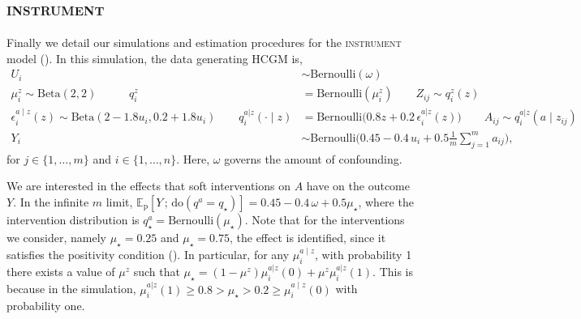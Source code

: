 \documentclass[12pt]{article}
\newcommand{\rmdo}{\mathrm{do}}
\newcommand{\s}{\, ; \,}
\newcommand{\pr}{\mathrm{p}}
\begin{document}
\subsection{\textsc{instrument}} \label{apx:instrument_sim}

Finally we detail our simulations and estimation procedures for the \textsc{instrument} model ().
In this simulation, the data generating HCGM is,
\begin{equation*}
\begin{split}
        U_i &\sim \mathrm{Bernoulli}(\omega)\\
        \mu_i^{z} \sim \mathrm{Beta}(2, 2)  \, \, \, \, \, \quad \quad q^{z}_i &= \mathrm{Bernoulli}(\mu_i^{z})
        \quad \quad Z_{ij} \sim q^{z}_i(z)\\
        \epsilon_i^{a \mid z}(z) \sim \mathrm{Beta}(2 - 1.8 u_i, 0.2 +  1.8 u_i) \quad \quad q^{a | z}_i(\cdot \mid z) &= \mathrm{Bernoulli}\Big(0.8 z + 0.2 \, \epsilon_i^{a |z }(z)\Big) \quad \quad 
        A_{ij} \sim q^{a |z }_i(a \mid z_{ij}) \\ Y_i &\sim \mathrm{Bernoulli}\Big(0.45 - 0.4\, u_i + 0.5\frac{1}{m}\sum_{j=1}^m a_{ij} \Big),
\end{split}
\end{equation*}
for $j \in \{1, \ldots, m\}$ and $i \in\{1, \ldots,n\}$.
Here, $\omega$ governs the amount of confounding.


We are interested in the effects that soft interventions on $A$ have on the outcome $Y$.
In the infinite $m$ limit,
$\mathbb{E}_\pr[Y \s \rmdo(q^{a} = q_\star)] = 0.45 - 0.4\, \omega + 0.5 \mu_\star$,
where the intervention distribution is $q_\star^a = \mathrm{Bernoulli}(\mu_\star)$.
Note that for the interventions we consider, namely $\mu_\star = 0.25$ and $\mu_\star = 0.75$, the effect is identified, since it satisfies the positivity condition ().
In particular, for any $\mu^{a \mid z}_i$,  with probability 1 there exists a value of $\mu^{z}$ such that $\mu_{\star} = (1 - \mu^z)\mu^{a | z}_i(0) + \mu^{z} \mu^{a|z}_i(1)$. 
This is because in the simulation, $\mu^{a | z}_i(1) \ge 0.8 >  \mu_{\star} > 0.2 \ge \mu^{a \mid z}_i(0)$ with probability one.
\end{document}
